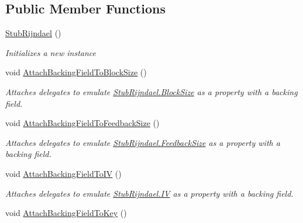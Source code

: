 \subsection*{Public Member Functions}
\begin{DoxyCompactItemize}
\item 
\hyperlink{class_system_1_1_security_1_1_cryptography_1_1_fakes_1_1_stub_rijndael_a88e6472a27e152daba71cf1b16385c6d}{Stub\-Rijndael} ()
\begin{DoxyCompactList}\small\item\em Initializes a new instance\end{DoxyCompactList}\item 
void \hyperlink{class_system_1_1_security_1_1_cryptography_1_1_fakes_1_1_stub_rijndael_a528d977ebaaf2b06399f44f6ad75b3c2}{Attach\-Backing\-Field\-To\-Block\-Size} ()
\begin{DoxyCompactList}\small\item\em Attaches delegates to emulate \hyperlink{class_system_1_1_security_1_1_cryptography_1_1_fakes_1_1_stub_rijndael_a4a7ce9f29e777b5feb557ca5172c02c1}{Stub\-Rijndael.\-Block\-Size} as a property with a backing field.\end{DoxyCompactList}\item 
void \hyperlink{class_system_1_1_security_1_1_cryptography_1_1_fakes_1_1_stub_rijndael_ab771858224cbc5067380613b18a4eddd}{Attach\-Backing\-Field\-To\-Feedback\-Size} ()
\begin{DoxyCompactList}\small\item\em Attaches delegates to emulate \hyperlink{class_system_1_1_security_1_1_cryptography_1_1_fakes_1_1_stub_rijndael_ac80889cf4a206edd1ada2f35c4c150dc}{Stub\-Rijndael.\-Feedback\-Size} as a property with a backing field.\end{DoxyCompactList}\item 
void \hyperlink{class_system_1_1_security_1_1_cryptography_1_1_fakes_1_1_stub_rijndael_a24e971a8321643639ca8016edd1d5de8}{Attach\-Backing\-Field\-To\-I\-V} ()
\begin{DoxyCompactList}\small\item\em Attaches delegates to emulate \hyperlink{class_system_1_1_security_1_1_cryptography_1_1_fakes_1_1_stub_rijndael_a451f509d49791eaa32db10f19da0ef80}{Stub\-Rijndael.\-I\-V} as a property with a backing field.\end{DoxyCompactList}\item 
void \hyperlink{class_system_1_1_security_1_1_cryptography_1_1_fakes_1_1_stub_rijndael_acf7fe725d04af82d40b3e78e84843ac8}{Attach\-Backing\-Field\-To\-Key} ()

\end{DoxyCompactItemize}
